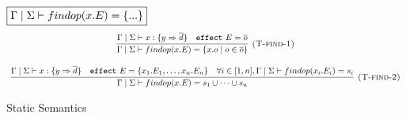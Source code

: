 \documentclass{article}
\theoremstyle{definition}
\newcommand{\keywadj}[1]{\mathtt{#1}}
\newcommand{\keyw}[1]{\keywadj{#1}~}
\begin{document}
\begin{figure}[H]
\noindent$\fbox{$\Gamma \mid \Sigma \vdash findop(x.E) = \{...\} $}$
\[
\begin{array}{c}
      \infer[\textsc{(T-find-1)}]
  {\Gamma \mid \Sigma \vdash findop(x.E) = \{x.o \mid o \in \overline{o}\} }
  {\Gamma \mid \Sigma \vdash x : \{y \Rightarrow \overline{d}\} & \keyw{effect} E = \overline{o}} \\[3ex]
        \infer[\textsc{(T-find-2)}]
  {\Gamma \mid \Sigma \vdash findop(x.E) = s_1 \cup \dots \cup s_n }
  {\Gamma \mid \Sigma \vdash x : \{y \Rightarrow \overline{d}\} & \keyw{effect} E = \{x_1.E_1, \dots, x_n.E_n\} & \forall i \in [1, n], \Gamma \mid \Sigma \vdash findop(x_i.E_i) = s_i} 
\end{array} 
\]

\caption{Static Semantics}
\label{wrap-static}
\end{figure}
\end{document}
